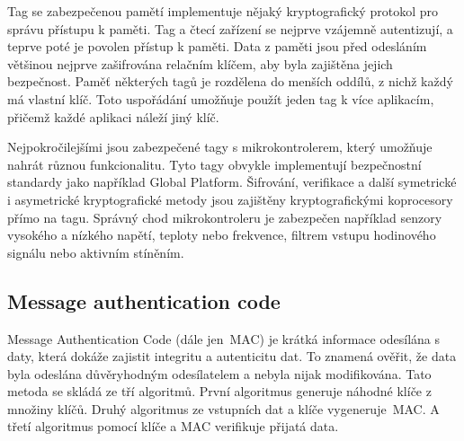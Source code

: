 \par
Tag se zabezpečenou pamětí implementuje nějaký kryptografický protokol pro správu přístupu k paměti. Tag a čtecí zařízení se nejprve vzájemně autentizují, a teprve poté je povolen přístup k paměti. Data z paměti jsou před odesláním většinou nejprve zašifrována relačním klíčem, aby byla zajištěna jejich bezpečnost. Paměť některých tagů je rozdělena do menších oddílů, z nichž každý má vlastní klíč. Toto uspořádání umožňuje použít jeden tag k více aplikacím, přičemž každé aplikaci náleží jiný klíč.
\par
Nejpokročilejšími jsou zabezpečené tagy s mikrokontrolerem, který umožňuje nahrát různou funkcionalitu. Tyto tagy obvykle implementují bezpečnostní standardy jako například Global Platform. Šifrování, verifikace a další symetrické i asymetrické kryptografické metody jsou zajištěny kryptografickými koprocesory přímo na tagu\cite{Mifare_Classic_story}. Správný chod mikrokontroleru je zabezpečen například senzory vysokého a nízkého napětí, teploty nebo frekvence, filtrem vstupu hodinového signálu nebo aktivním stíněním\cite{NXP_Microcontroller_overview}.

\subsection{Message authentication code}
Message Authentication Code (dále jen~MAC) je krátká informace odesílána s daty, která dokáže zajistit integritu a autenticitu dat. To znamená ověřit, že data byla odeslána důvěryhodným odesílatelem a nebyla nijak modifikována. Tato metoda se skládá ze tří algoritmů. První algoritmus generuje náhodné klíče z množiny klíčů. Druhý algoritmus ze vstupních dat a klíče vygeneruje~MAC. A třetí algoritmus pomocí klíče a MAC verifikuje přijatá data\cite{Foundations_Of_Cryptography}.
\par

